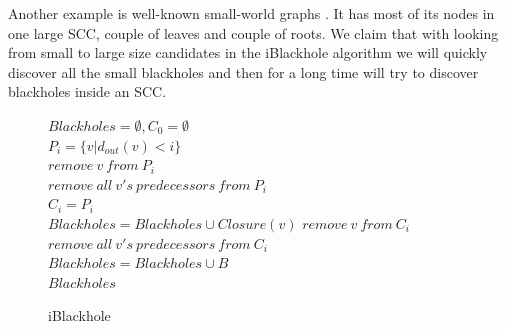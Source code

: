 \documentclass{svproc}
\begin{document}
Another example is well-known small-world graphs \cite{watts1999networks}. It has most of its nodes in one large SCC, couple of leaves and couple of roots.
We claim that with looking from small to large size candidates in the iBlackhole algorithm we will quickly discover all the small blackholes and then for a long time will try to discover blackholes inside an SCC.

\begin{figure}[H]
	\begin{center}
		\begin{algorithm}[H]
			\SetAlgoLined

                        $Blackholes = \emptyset, C_0 = \emptyset$ \\
                         {
                            $P_i = \{v | d_{out}(v) < i\}$  
                             \\
                             {
                                 {
                                     {
                                        $remove\ v\ from\ P_i$\\
                                        $remove\ all\ v's\ predecessors\ from\ P_i$\\
                                    }
                                }
                            }
                        }
                        $C_i = P_i$   \\
                         {
                             {
                                $Blackholes = Blackholes \cup Closure(v)$
                            }
                             {
                                $remove\ v\ from\ C_i$ \\
                                $remove\ all\ v's\ predecessors\ from\ C_i$ \\
                            }
                        }
                         {
                             {
                                 {
                                    $Blackholes = Blackholes \cup B$ \\
                                }
                            }
                        }
                        \Return $Blackholes$
			\label{alg:iblackhole}
			\caption{iBlackhole}
		\end{algorithm}
	\end{center}
\end{figure}
\end{document}
